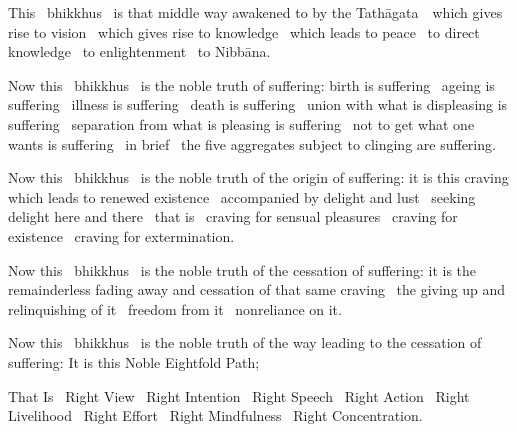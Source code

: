 \begin{english-hang}
This \breathmark\ bhikkhus \breathmark\ is that middle way awakened to by the \mbox{Tathāgata}~\breathmark\ which gives rise to vision \breathmark\ which gives rise to knowledge \breathmark\ which leads to peace \breathmark\ to direct knowledge \breathmark\ to enlightenment \breathmark\ to Nibbāna.
\end{english-hang}

\begin{english-hang}
Now this \breathmark\ bhikkhus \breathmark\ is the noble truth of suffering: birth is suffering \breathmark\ ageing is suffering \breathmark\ illness is suffering \breathmark\ death is suffering \breathmark\ union with what is displeasing is suffering \breathmark\ separation from what is pleasing is suffering \breathmark\ not to get what one wants is suffering \breathmark\ in brief \breathmark\ the five aggregates subject to clinging are suffering.
\end{english-hang}

\begin{english-hang}
Now this \breathmark\ bhikkhus \breathmark\ is the noble truth of the origin of suffering: it is this craving which leads to renewed existence \breathmark\ accompanied by delight and lust \breathmark\ seeking delight here and there \breathmark\ that is \breathmark\ craving for sensual pleasures \breathmark\ craving for existence \breathmark\ craving for extermination.
\end{english-hang}

\begin{english-hang}
Now this \breathmark\ bhikkhus \breathmark\ is the noble truth of the cessation of suffering: it is the remainderless fading away and cessation of that same craving \breathmark\ the giving up and relinquishing of it \breathmark\ freedom from it \breathmark\ nonreliance on it.
\end{english-hang}

\begin{english-hang}
Now this \breathmark\ bhikkhus \breathmark\ is the noble truth of the way leading to the cessation of suffering: It is this Noble Eightfold Path;
\end{english-hang}

\begin{english-hang}
That Is \breathmark\ Right View \breathmark\ Right Intention \breathmark\ Right Speech \breathmark\ Right Action \breathmark\ Right Livelihood \breathmark\ Right Effort \breathmark\ Right Mindfulness \breathmark\ Right Concentration.
\end{english-hang}

